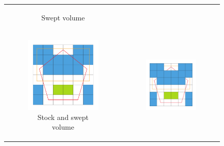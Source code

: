 \begin{figure}[!h]
\begin{tabular}{cc}
\begin{subfigure}[t]{0.3\textwidth}
			\caption{Swept volume}
			\label{fig:classification_sv}
		\end{subfigure}\\
		\begin{subfigure}[t]{0.3\textwidth}
			\centering
			\includegraphics[width=\textwidth]{images/classification_after}
			\caption{Stock and swept volume}
			\label{fig:classification_after}
		\end{subfigure}&
		\begin{subfigure}[t]{0.3\textwidth}
			\centering
			\includegraphics[width=\textwidth]{images/classification_after_removal}

\end{subfigure}
\end{tabular}
\end{figure}
